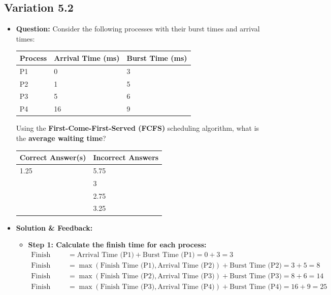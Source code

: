 \subsection{Variation 5.2}
\begin{itemize}
    \item \textbf{Question:} Consider the following processes with their burst times and arrival times:
    
    \begin{tabular}{|l|l|l|}
        \hline
        \textbf{Process} & \textbf{Arrival Time (ms)} & \textbf{Burst Time (ms)} \\
        \hline
        P1 & 0 & 3 \\
        P2 & 1 & 5 \\
        P3 & 5 & 6 \\
        P4 & 16 & 9 \\
        \hline
    \end{tabular}
    
    Using the \textbf{First-Come-First-Served (FCFS)} scheduling algorithm, what is the \textbf{average waiting time}?
    
    \begin{tabular}{|l|l|}
        \hline
        \textbf{Correct Answer(s)} & \textbf{Incorrect Answers} \\
        \hline
        1.25 & 5.75 \\
         & 3 \\
         & 2.75 \\
         & 3.25 \\
        \hline
    \end{tabular}
    
    \item \textbf{Solution \& Feedback:}
    \begin{itemize}
        \item \textbf{Step 1: Calculate the finish time for each process:}
        \begin{align*}
            \text{Finish Time (P1)} &= \text{Arrival Time (P1)} + \text{Burst Time (P1)} = 0 + 3 = 3 \\
            \text{Finish Time (P2)} &= \max(\text{Finish Time (P1)}, \text{Arrival Time (P2)}) + \text{Burst Time (P2)} = 3 + 5 = 8 \\
            \text{Finish Time (P3)} &= \max(\text{Finish Time (P2)}, \text{Arrival Time (P3)}) + \text{Burst Time (P3)} = 8 + 6 = 14 \\
            \text{Finish Time (P4)} &= \max(\text{Finish Time (P3)}, \text{Arrival Time (P4)}) + \text{Burst Time (P4)} = 16 + 9 = 25 \\
        \end{align*}
        

\end{itemize}
\end{itemize}
